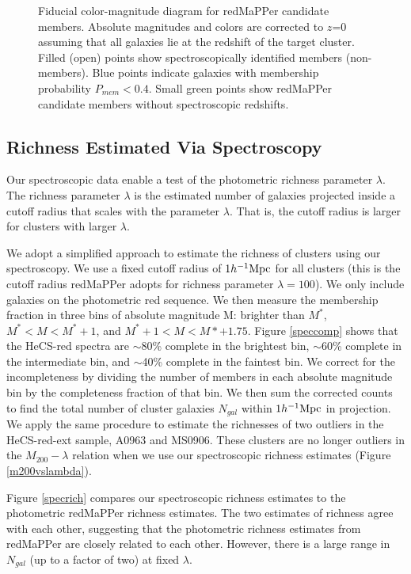 \begin{figure} 
\caption{\label{pmemrabsgr} Fiducial color-magnitude diagram for redMaPPer candidate members. Absolute magnitudes and colors are corrected to $z$=0 assuming that all galaxies lie at the redshift of the target cluster. Filled (open) points show spectroscopically identified members (non-members).  Blue points indicate galaxies with membership probability $P_{mem}<0.4$.  Small green points show redMaPPer candidate members without spectroscopic redshifts.    
  }
\end{figure}

\subsection{Richness Estimated Via Spectroscopy \label{specrichtext}}

Our spectroscopic data enable a test of the photometric richness parameter $\lambda$.
The richness parameter $\lambda$ is the estimated number of galaxies projected inside a 
cutoff radius that scales with the parameter $\lambda$.  That is, the cutoff radius is 
larger for clusters with larger $\lambda$. 

We adopt a simplified approach to estimate the richness of clusters using our spectroscopy. 
We use a fixed cutoff radius of $1 h^{-1}{\rm Mpc}$ for all clusters (this is the cutoff radius redMaPPer 
adopts for richness parameter $\lambda=100$).  We only include galaxies on the 
photometric red sequence.  We then measure the membership fraction in three bins of 
absolute magnitude M: brighter than $M^*$, $M^*<M<M^*+1$, and $M^*+1<M<M*+1.75$. 
Figure \ref{speccomp} shows that the HeCS-red spectra are $\sim$80\% complete in 
the brightest bin, $\sim$60\% complete in the intermediate bin, and $\sim$40\% 
complete in the faintest bin.  We correct for the incompleteness by dividing the number of 
members in each absolute magnitude bin by the completeness fraction of that bin.  We 
then sum the corrected counts to find the total number of cluster galaxies $N_{gal}$ within $1 h^{-1}{\rm Mpc}$ 
in projection.  We apply the same procedure to estimate the richnesses of two outliers in 
the HeCS-red-ext sample, A0963 and MS0906.  These clusters are no longer outliers 
in the $M_{200}-\lambda$ relation when we use our spectroscopic richness estimates 
(Figure \ref{m200vslambda}).

Figure \ref{specrich} compares our spectroscopic richness estimates to the photometric 
redMaPPer richness estimates.  The two estimates of richness agree  with each other, 
suggesting that the photometric richness estimates from redMaPPer are closely related 
to each other. However, there is a large range in $N_{gal}$ (up to a factor of two) at
fixed $\lambda$.

